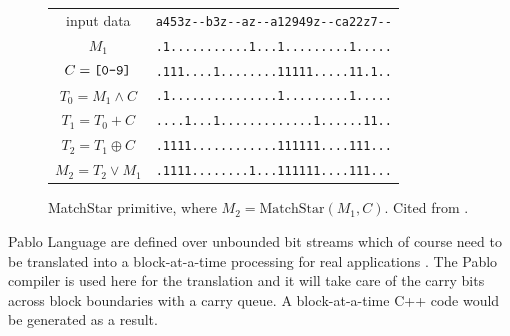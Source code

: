 \begin{figure}[tbh]
\begin{center}
\begin{tabular}{cr}\\
input data  & \verb`a453z--b3z--az--a12949z--ca22z7--`\\
$M_1$ & \verb`.1...........1...1.........1.....`\\
$C = \text{\tt [0-9]}$ & \verb`.111....1........11111.....11.1..`\\
$T_0 = M_1 \wedge C$ & \verb`.1...............1.........1.....`\\
$T_1 = T_0 + C$ & \verb`....1...1.............1......11..`\\
$T_2 = T_1 \oplus C$ & \verb`.1111............111111....111...`\\
$M_2 = T_2 \vee M_1$ & \verb`.1111........1...111111....111...`
\end{tabular}
\end{center}
\caption[MatchStar Using Bitstream Addition and Mask]{MatchStar primitive, where $M_2 = \text{MatchStar}(M_1, C)$. Cited from \cite{rob_regex}.}
\label{figure:matchstar}
\end{figure}

Pablo Language are defined over unbounded bit streams which of course need to be translated into a block-at-a-time processing for real applications \cite{rob_regex}. The Pablo compiler is used here for the translation and it will take care of the carry bits across block boundaries with a carry queue. A block-at-a-time C++ code would be generated as a result.

